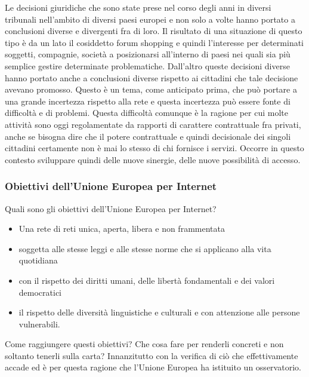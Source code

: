 Le decisioni giuridiche che sono state prese nel corso degli anni in diversi tribunali nell'ambito di diversi paesi europei e non solo a volte hanno portato a conclusioni diverse e divergenti fra di loro. Il risultato di una situazione di questo tipo è da un lato il cosiddetto forum shopping e quindi l'interesse per determinati soggetti, compagnie, società a posizionarsi all'interno di paesi nei quali sia più semplice gestire determinate problematiche. Dall'altro queste decisioni diverse hanno portato anche a conclusioni diverse rispetto ai cittadini che tale decisione avevano promosso. Questo è un tema, come anticipato prima, che può portare a una grande incertezza rispetto alla rete e questa incertezza può essere fonte di difficoltà e di problemi. Questa difficoltà comunque è la ragione per cui molte attività sono oggi regolamentate da rapporti di carattere contrattuale fra privati, anche se bisogna dire che il potere contrattuale e quindi decisionale dei singoli cittadini certamente non è mai lo stesso di chi fornisce i servizi. Occorre in questo contesto sviluppare quindi delle nuove sinergie, delle nuove possibilità di accesso.

\subsubsection{Obiettivi dell'Unione Europea per Internet}
Quali sono gli obiettivi dell'Unione Europea per Internet?

\begin{itemize}
    \item Una rete di reti unica, aperta, libera e non frammentata
    \item soggetta alle stesse leggi e alle stesse norme che si applicano alla vita quotidiana
    \item con il rispetto dei diritti umani, delle libertà fondamentali e dei valori democratici
    \item il rispetto delle diversità linguistiche e culturali e con attenzione alle persone vulnerabili.
\end{itemize}
Come raggiungere questi obiettivi? Che cosa fare per renderli concreti e non soltanto tenerli sulla carta? Innanzitutto con la verifica di ciò che effettivamente accade ed è per questa ragione che l'Unione Europea ha istituito un osservatorio.

